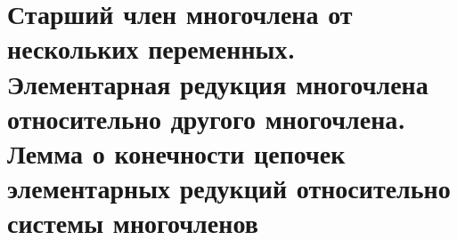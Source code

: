 \section{Старший член многочлена от нескольких переменных. Элементарная редукция многочлена относительно другого многочлена. Лемма о конечности цепочек элементарных редукций относительно системы многочленов}